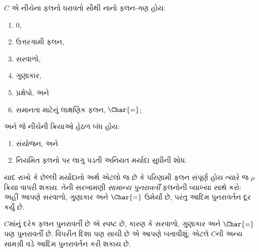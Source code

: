 \documentclass[../../../include/open-logic-section]{subfiles}
\begin{document}

$C$ એ નીચેના ફલનો ધરાવતો સૌથી નાનો ફલન-ગણ હોય:
\begin{enumerate}
\item $0$,
\item ઉત્તરગામી ફલન,
\item સરવાળો,
\item ગુણાકાર,
\item પ્રક્ષેપો, અને
\item સમાનતા માટેનું લાક્ષણિક ફલન, $\Char{=}$;
\end{enumerate}
અને જે નીચેની ક્રિયાઓ હેઠળ બંધ હોય:
\begin{enumerate}
\item સંયોજન, અને
\item નિયમિત ફલનો પર લાગુ પડતી અનિયત મર્યાદા સુધીની શોધ.
\end{enumerate}
યાદ રાખો કે છેલ્લી મર્યાદાનો અર્થ એટલો જ છે કે
પરિણામી ફલન સંપૂર્ણ હોય ત્યારે જ $\mu$ ક્રિયા
વાપરી શકાય. તેની સરખામણી \emph{સામાન્ય પુનરાવર્તી}
ફલનોની વ્યાખ્યા સાથે કરો: અહીં આપણે સરવાળો, ગુણાકાર
અને $\Char{=}$ ઉમેર્યાં છે, પરંતુ આદિમ પુનરાવર્તન
દૂર કર્યું છે.

$C$માંનું દરેક ફલન પુનરાવર્તી છે એ સ્પષ્ટ છે,
કારણ કે સરવાળો, ગુણાકાર અને $\Char{=}$ પણ
પુનરાવર્તી છે. વિપરીત દિશા પણ સાચી છે એ આપણે
બતાવીશું; એટલે $C$ની અન્ય સામગ્રી વડે આદિમ
પુનરાવર્તન કરી શકાય છે.
\end{document}
